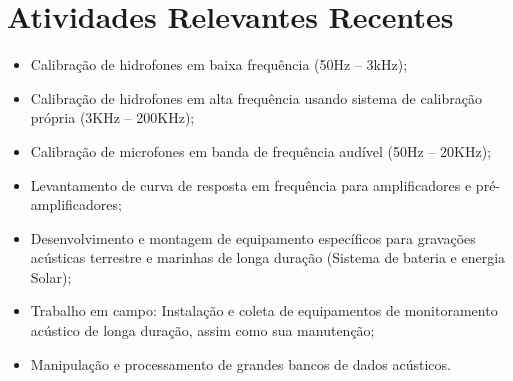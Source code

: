 \documentclass[a4paper,10pt]{article}
\begin{document}
\section{Atividades Relevantes Recentes}

\begin{itemize}
    \item Calibração de hidrofones em baixa frequência (50Hz – 3kHz);
    \item Calibração de hidrofones em alta frequência usando sistema de calibração própria (3KHz – 200KHz);
    \item Calibração de microfones em banda de frequência audível (50Hz – 20KHz);
    \item Levantamento de curva de resposta em frequência para amplificadores e pré-amplificadores;
    \item Desenvolvimento e montagem de equipamento específicos para gravações acústicas terrestre e marinhas de longa duração (Sistema de bateria e energia Solar);
    \item Trabalho em campo: Instalação e coleta de equipamentos de monitoramento acústico de longa duração, assim como sua manutenção;
    \item Manipulação e processamento de grandes bancos de dados acústicos.\\
\end{itemize}

\end{document}
